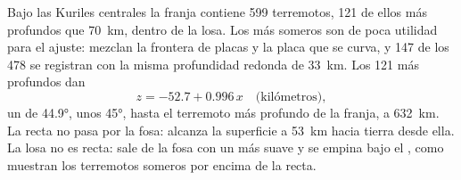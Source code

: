 Bajo las Kuriles centrales la franja contiene 599 terremotos, 121 de ellos más profundos que \qty{70}{km}, dentro de la losa. Los más someros
son de poca utilidad para el ajuste: mezclan la frontera de placas y la placa que se curva, y 147 de los 478 se registran con la misma
profundidad redonda de \qty{33}{km}. Los 121 más profundos dan
\[
  z = -52.7 + 0.996\,x \quad\text{(kilómetros)},
\]
un  de \ang{44.9}, unos \ang{45}, hasta el terremoto más profundo de la franja, a \qty{632}{km}. La recta no pasa por la fosa:
alcanza la superficie a \qty{53}{km} hacia tierra desde ella. La losa no es recta: sale de la fosa con un  más suave y se empina bajo
el , como muestran los terremotos someros por encima de la recta.

